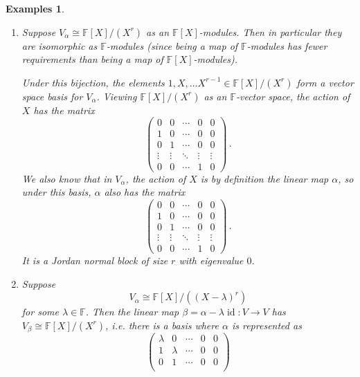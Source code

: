 \documentclass{article}
\theoremstyle{plain}\theoremheaderfont{\normalfont\itshape}\theorembodyfont{\rmfamily}\theoremseparator{.}\newtheorem*{rem}{Remark}\newtheorem*{ex}{Example}\newtheorem*{proof}{Proof}\newtheorem*{altp}{Alternative proof}\newtheorem*{nonex}{Non-Example}
\theoremstyle{plain}\theoremheaderfont{\normalfont\bfseries}\theorembodyfont{\rmfamily}\theoremseparator{.}\newtheorem{thm}{Theorem}[section]\newtheorem{lem}[thm]{Lemma}\newtheorem{prop}[thm]{Proposition}\newtheorem*{cor}{Corollary}\newtheorem{defn}[thm]{Definition}\newtheorem{clm}[thm]{Claim}\newtheorem{clminproof}{Claim}\newtheorem*{notn}{Notation}\newtheorem*{exer}{Exercise}\newtheorem*{lemnn}{Lemma}
\theoremstyle{break}\theoremheaderfont{\normalfont\itshape}\theorembodyfont{\rmfamily}\theoremseparator{.\medskip}\newtheorem*{proofskip}{Proof}\newtheorem*{exs}{Examples}\newtheorem*{rems}{Remarks}\newtheorem*{obs}{Observations}
\theoremstyle{break}\theoremheaderfont{\normalfont\bfseries}\theorembodyfont{\rmfamily}\theoremseparator{.\medskip}\newtheorem{lemskip}[thm]{Lemma}\newtheorem{defnskip}[thm]{Definition}\newtheorem{propskip}[thm]{Proposition}\newtheorem{thmskip}[thm]{Theorem}
\numberwithin{equation}{section}
\DeclareMathOperator*{\id}{id}
\newcommand{\FF}{\mathbb{F}}
\begin{document}
    \begin{exs}
        \begin{enumerate}[topsep=0pt,label=(\roman*)]
            \item Suppose \(V_\alpha\cong\FF[X]/(X^r)\) as an \(\FF[X]\)-modules. Then in particular they are isomorphic as \(\FF\)-modules (since being a map of \(\FF\)-modules has fewer requirements than being a map of \(\FF[X]\)-modules).
            
            Under this bijection, the elements \(1,X,\dots X^{r-1}\in \FF[X]/(X^r)\) form a vector space basis for \(V_\alpha\). Viewing \(\FF[X]/(X^r)\) as an \(\FF\)-vector space, the action of \(X\) has the matrix
            \[\begin{pmatrix}
                0 & 0 & \cdots & 0 & 0\\
                1 & 0 & \cdots & 0 & 0\\
                0 & 1 & \cdots & 0 & 0\\
                \vdots & \vdots & \ddots & \vdots & \vdots \\
                0 & 0 & \cdots & 1 & 0
            \end{pmatrix}\,.\]
            We also know that in \(V_\alpha\), the action of \(X\) is by definition the linear map \(\alpha\), so under this basis, \(\alpha\) also has the matrix
            \[\begin{pmatrix}
                0 & 0 & \cdots & 0 & 0\\
                1 & 0 & \cdots & 0 & 0\\
                0 & 1 & \cdots & 0 & 0\\
                \vdots & \vdots & \ddots & \vdots & \vdots \\
                0 & 0 & \cdots & 1 & 0
            \end{pmatrix}\,.\]
            It is a Jordan normal block of size \(r\) with eigenvalue \(0\).
            \item Suppose
            \[V_\alpha\cong\FF[X]/((X-\lambda)^r)\]
            for some \(\lambda\in\FF\). Then the linear map \(\beta=\alpha-\lambda\id:V\to V\) has \(V_\beta\cong\FF[X]/(X^r)\), i.e. there is a basis where \(\alpha\) is represented as
            \[\begin{pmatrix}
                \lambda & 0 & \cdots & 0 & 0 \\
                1 & \lambda & \cdots & 0 & 0 \\
                0 & 1 & \cdots & 0 & 0 \\

\end{pmatrix}\]
\end{enumerate}
\end{exs}
\end{document}
